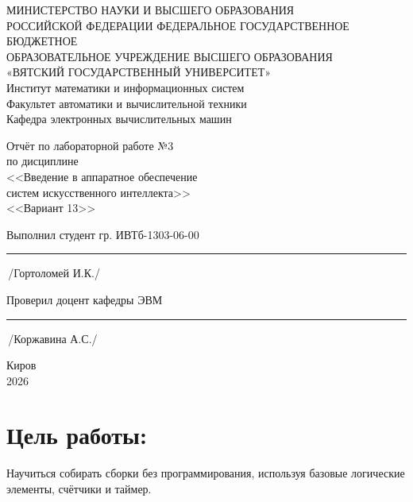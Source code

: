 \documentclass[oneside,a4paper,14pt]{extarticle} %
\begin{document}
	\newpage\thispagestyle{empty}
	\begin{center}
		МИНИСТЕРСТВО НАУКИ И ВЫСШЕГО ОБРАЗОВАНИЯ\\
			РОССИЙСКОЙ ФЕДЕРАЦИИ
			ФЕДЕРАЛЬНОЕ ГОСУДАРСТВЕННОЕ БЮДЖЕТНОЕ\\
			ОБРАЗОВАТЕЛЬНОЕ
			УЧРЕЖДЕНИЕ ВЫСШЕГО ОБРАЗОВАНИЯ\\
			«ВЯТСКИЙ ГОСУДАРСТВЕННЫЙ УНИВЕРСИТЕТ»\\
			Институт математики и информационных систем\\
			Факультет автоматики и вычислительной техники\\
			Кафедра электронных вычислительных машин
	\end{center}
	\vspace{20mm}

	\begin{center}
		Отчёт по лабораторной работе №3\\
		по дисциплине\\
		<<Введение в аппаратное обеспечение \\ систем искусственного интеллекта>>\\
		<<Вариант 13>>\\
	\end{center}
	\vspace{48mm}

	Выполнил студент гр. ИВТб-1303-06-00 \hspace{10mm} \rule[-0,5mm]{23mm}{0.15mm}\,/Гортоломей И.К./


	Проверил доцент кафедры ЭВМ \hfill  \rule[-0,5mm]{30mm}{0.15mm}\,/Коржавина А.С./

	\vfill
	\begin{center}
		Киров\\
		2026
	\end{center}

	\newpage
	\thispagestyle{empty}

	\section*{Цель работы:} Научиться собирать сборки без программирования, используя базовые логические элементы, счётчики и таймер.
\end{document}
